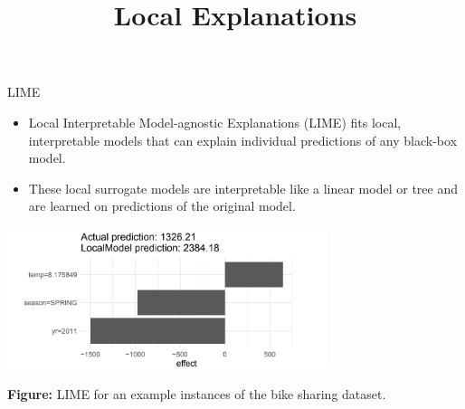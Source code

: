 \documentclass[11pt,compress,t,notes=noshow, xcolor=table]{beamer}
\title{Local Explanations}
\institute{\href{https://compstat-lmu.github.io/lecture_i2ml/}{compstat-lmu.github.io/lecture\_i2ml}}
\date{}
\begin{document}
	
	
	
	
	
	
	
	
	


\begin{vbframe}{LIME}
\begin{itemize}
        \item  Local Interpretable Model-agnostic Explanations (LIME) fits local, interpretable models that can explain individual predictions of any black-box model.
        \item  These local surrogate models are interpretable like a linear model or tree  and are learned on predictions of the original model. 
\end{itemize}

\begin{center}
\includegraphics[width=0.7\textwidth]{figure/lime-effect.png}
\end{center}   

\textbf{Figure:} LIME for an example instances of the bike sharing dataset.
\end{vbframe}
\end{document}
